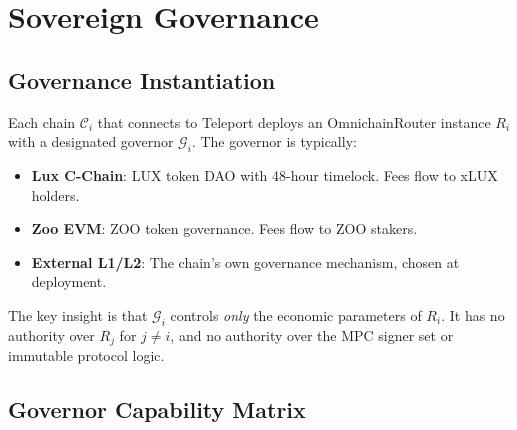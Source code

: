 \documentclass[11pt,twocolumn]{article}
\theoremstyle{definition}
\newcommand{\Gov}{\mathcal{G}}
\newcommand{\Chain}{\mathcal{C}}
\begin{document}
\section{Sovereign Governance}
\label{sec:governance}

\subsection{Governance Instantiation}

Each chain $\Chain_i$ that connects to Teleport deploys an OmnichainRouter instance $R_i$ with a designated governor $\Gov_i$. The governor is typically:

\begin{itemize}[nosep]
  \item \textbf{Lux C-Chain}: LUX token DAO with 48-hour timelock. Fees flow to xLUX holders.
  \item \textbf{Zoo EVM}: ZOO token governance. Fees flow to ZOO stakers.
  \item \textbf{External L1/L2}: The chain's own governance mechanism, chosen at deployment.
\end{itemize}

\noindent
The key insight is that $\Gov_i$ controls \emph{only} the economic parameters of $R_i$. It has no authority over $R_j$ for $j \neq i$, and no authority over the MPC signer set or immutable protocol logic.

\subsection{Governor Capability Matrix}
\end{document}
